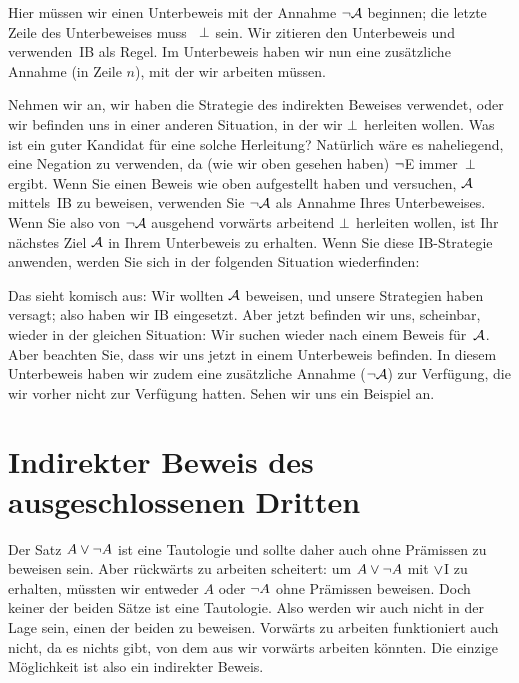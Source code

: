 \begin{fitchproof}
\open
{}
\ellipsesline 
{}
\close
{}
\end{fitchproof}
Hier müssen wir einen Unterbeweis mit der Annahme $\neg \mathcal{A}$ beginnen; die letzte Zeile des Unterbeweises muss ~$\bot$ sein. Wir zitieren den Unterbeweis und verwenden~IB als Regel. Im Unterbeweis haben wir nun eine zusätzliche Annahme (in Zeile $n$), mit der wir arbeiten müssen.

Nehmen wir an, wir haben die Strategie des indirekten Beweises verwendet, oder wir befinden uns in einer anderen Situation, in der wir $\bot$ herleiten wollen. Was ist ein guter Kandidat für eine solche Herleitung? Natürlich wäre es naheliegend, eine Negation zu verwenden, da (wie wir oben gesehen haben) $\neg$E immer~$\bot$ ergibt. Wenn Sie einen Beweis wie oben aufgestellt haben und versuchen, $\mathcal{A}$ mittels~IB zu beweisen, verwenden Sie $\neg \mathcal{A}$ als Annahme Ihres Unterbeweises. Wenn Sie also von $\neg \mathcal{A}$ ausgehend vorwärts arbeitend $\bot$ herleiten wollen, ist Ihr nächstes Ziel $\mathcal{A}$ in Ihrem Unterbeweis zu erhalten. Wenn Sie diese IB-Strategie anwenden, werden Sie sich in der folgenden Situation wiederfinden: 
\begin{fitchproof}
\open
{}
\ellipsesline
{}
\close
{}
\end{fitchproof} 
Das sieht komisch aus: Wir wollten $\mathcal{A}$ beweisen, und unsere Strategien haben versagt; also haben wir IB eingesetzt. Aber jetzt befinden wir uns, scheinbar, wieder in der gleichen Situation: Wir suchen wieder nach einem Beweis für~$\mathcal{A}$. Aber beachten Sie, dass wir uns jetzt in einem Unterbeweis befinden. In diesem Unterbeweis haben wir zudem eine zusätzliche Annahme ($\neg \mathcal{A}$) zur Verfügung, die wir vorher nicht zur Verfügung hatten. Sehen wir uns ein Beispiel an.

\section{Indirekter Beweis des ausgeschlossenen Dritten}\label{s:proofLEM}

Der Satz $A \vee \neg A$ ist eine Tautologie und sollte daher auch ohne Prämissen zu beweisen sein. Aber rückwärts zu arbeiten scheitert: um $A \vee \neg A$ mit $\vee$I zu erhalten, müssten wir entweder $A$ oder $\neg A$ ohne Prämissen beweisen. Doch keiner der beiden Sätze ist eine Tautologie. Also werden wir auch nicht in der Lage sein, einen der beiden zu beweisen. Vorwärts zu arbeiten funktioniert auch nicht, da es nichts gibt, von dem aus wir vorwärts arbeiten könnten. Die einzige Möglichkeit ist also ein indirekter Beweis.

